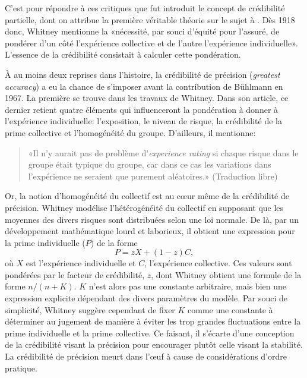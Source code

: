 C'est pour répondre à ces critiques que fut introduit le concept de
crédibilité partielle, dont on attribue la première véritable théorie
sur le sujet à \citet{Whitney:1918}. Dès 1918 donc, Whitney mentionne la
«nécessité, par souci d'équité pour l'assuré, de pondérer d'un côté
l'expérience collective et de l'autre l'expérience individuelle».
L'essence de la crédibilité consistait à calculer cette pondération.

À au moins deux reprises dans l'histoire, la crédibilité de précision
(\emph{greatest accuracy}) a eu la chance de s'imposer avant la
contribution de Bühlmann en 1967. La première se trouve dans les
travaux de Whitney. Dans son article, ce dernier retient quatre
éléments qui influenceront la pondération à donner à l'expérience
individuelle: l'exposition, le niveau de risque, la crédibilité de la
prime collective et l'homogénéité du groupe. D'ailleurs, il mentionne:

\begin{quote}
  «Il n'y aurait pas de problème d'\emph{experience rating} si chaque
  risque dans le groupe était typique du groupe, car dans ce cas les
  variations dans l'expérience ne seraient que purement aléatoires.»
  (Traduction libre)
\end{quote}

Or, la notion d'homogénéité du collectif est au c{\oe}ur même de la
crédibilité de précision. Whitney modélise l'hétérogénéité du
collectif en supposant que les moyennes des divers risques sont
distribuées selon une loi normale. De là, par un développement
mathématique lourd et laborieux, il obtient une expression pour la
prime individuelle ($P$) de la forme
\begin{equation*}
  P = z X + (1 - z) C,
\end{equation*}
où $X$ est l'expérience individuelle et $C$, l'expérience collective.
Ces valeurs sont pondérées par le facteur de crédibilité, $z$, dont
Whitney obtient une formule de la forme $n/(n + K)$. $K$ n'est alors
pas une constante arbitraire, mais bien une expression explicite
dépendant des divers paramètres du modèle. Par souci de simplicité,
Whitney suggère cependant de fixer $K$ comme une constante à
déterminer au jugement de manière à éviter les trop grandes
fluctuations entre la prime individuelle et la prime collective. Ce
faisant, il s'écarte d'une conception de la crédibilité visant la
précision pour encourager plutôt celle visant la stabilité. La
crédibilité de précision meurt dans l'{\oe}uf à cause de
considérations d'ordre pratique.

